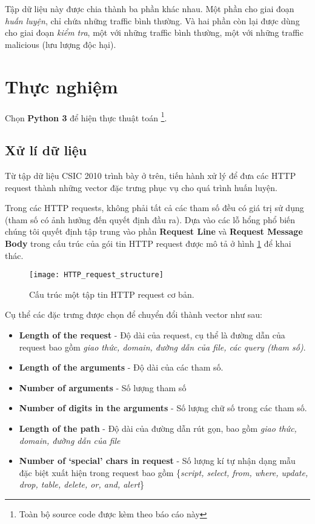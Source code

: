 \documentclass[../main-report.tex]{subfiles}
\begin{document}
Tập dữ liệu này được chia thành ba phần khác nhau. Một phần cho giai đoạn \emph{huấn luyện}, chỉ chứa những traffic bình thường. Và hai phần còn lại được dùng cho giai đoạn \emph{kiểm tra}, một với những traffic bình thường, một với những traffic malicious (lưu lượng độc hại).

\section{Thực nghiệm}
Chọn \textbf{Python 3} để hiện thực thuật toán \footnote{Toàn bộ source code được kèm theo báo cáo này}.
\subsection{Xử lí dữ liệu}
Từ tập dữ liệu CSIC 2010 trình bày ở trên, tiến hành xử lý để đưa các HTTP request thành những vector đặc trưng phục vụ cho quá trình huấn luyện.

Trong các HTTP requests, không phải tất cả các tham số đều có giá trị sử dụng (tham số có ảnh hưởng đến quyết định đầu ra). Dựa vào các lỗ hổng phổ biến chúng tôi quyết định tập trung vào phần \textbf{Request Line} và \textbf{Request Message Body} trong cấu trúc của gói tin HTTP request được mô tả ở hình \ref{fig:http_req_struct} để khai thác.

\begin{figure}[ht!]
\centering\texttt{[image: HTTP\_request\_structure]}
\caption{Cấu trúc một tập tin HTTP request cơ bản.}
\label{fig:http_req_struct}
\end{figure}

Cụ thể các đặc trưng được chọn để chuyển đổi thành vector như sau:

\begin{itemize}
\item \textbf{Length of the request} - Độ dài của request, cụ thể là đường dẫn của request bao gồm \emph{giao thức, domain, đường dẫn của file, các query (tham số)}.
\item \textbf{Length  of the arguments} - Độ dài của các tham số.
\item \textbf{Number of arguments} - Số lượng tham số
\item \textbf{Number of digits in the arguments} - Số lượng chữ số trong các tham số.
\item \textbf{Length of the path} - Độ dài của đường dẫn rút gọn, bao gồm \emph{giao thức, domain, đường dẫn của file}
\item \textbf{Number of `special' chars in request} - Số lượng kí tự nhận dạng mẫu đặc biệt xuất hiện trong request bao gồm \{\emph{script, select, from, where, update, drop, table, delete, or, and, alert}\}
\end{itemize}
\end{document}
